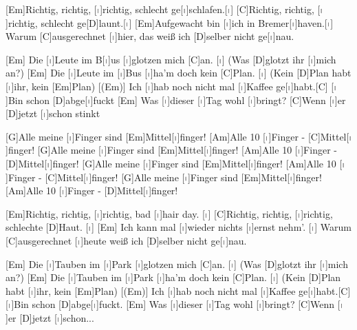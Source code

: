

\begin{guitar}
	[Em]Richtig, richtig, [$\shortmid$]richtig, schlecht ge[$\shortmid$]schlafen.[$\shortmid$]{}
	[C]Richtig, richtig, [$\shortmid$]richtig, schlecht ge[D]launt.[$\shortmid$]{}
	[Em]Aufgewacht bin [$\shortmid$]ich in Bremer[$\shortmid$]haven.[$\shortmid$]{}
	Warum [C]ausgerechnet [$\shortmid$]hier, das weiß ich [D]selber nicht ge[$\shortmid$]nau.
	
	[Em] Die [$\shortmid$]Leute im B[$\shortmid$]us [$\shortmid$]glotzen mich [C]an. [$\shortmid$] (Was [D]glotzt ihr [$\shortmid$]mich an?)
	[Em] Die [$\shortmid$]Leute im [$\shortmid$]Bus [$\shortmid$]ha'm doch kein [C]Plan. [$\shortmid$] (Kein [D]Plan habt [$\shortmid$]ihr, kein [Em]Plan)
	[(Em)] Ich [$\shortmid$]hab noch nicht mal [$\shortmid$]Kaffee ge[$\shortmid$]habt.[C] [$\shortmid$]Bin schon [D]abge[$\shortmid$]fuckt
	[Em] Was [$\shortmid$]dieser [$\shortmid$]Tag wohl [$\shortmid$]bringt? [C]Wenn [$\shortmid$]er [D]jetzt [$\shortmid$]schon stinkt
	
	[G]Alle meine [$\shortmid$]Finger sind [Em]Mittel[$\shortmid$]finger! [Am]Alle 10 [$\shortmid$]Finger - [C]Mittel[$\shortmid$]finger!
	[G]Alle meine [$\shortmid$]Finger sind [Em]Mittel[$\shortmid$]finger! [Am]Alle 10 [$\shortmid$]Finger - [D]Mittel[$\shortmid$]finger!
	[G]Alle meine [$\shortmid$]Finger sind [Em]Mittel[$\shortmid$]finger! [Am]Alle 10 [$\shortmid$]Finger - [C]Mittel[$\shortmid$]finger!
	[G]Alle meine [$\shortmid$]Finger sind [Em]Mittel[$\shortmid$]finger! [Am]Alle 10 [$\shortmid$]Finger - [D]Mittel[$\shortmid$]finger!
	
	[Em]Richtig, richtig, [$\shortmid$]richtig, bad [$\shortmid$]hair day. [$\shortmid$]{}
	[C]Richtig, richtig, [$\shortmid$]richtig, schlechte [D]Haut. [$\shortmid$]{}
	[Em] Ich kann mal [$\shortmid$]wieder nichts [$\shortmid$]ernst nehm'. [$\shortmid$]{}
	Warum [C]ausgerechnet [$\shortmid$]heute weiß ich [D]selber nicht ge[$\shortmid$]nau.
	
	[Em] Die [$\shortmid$]Tauben im [$\shortmid$]Park [$\shortmid$]glotzen mich [C]an. [$\shortmid$] (Was [D]glotzt ihr [$\shortmid$]mich an?)
	[Em] Die [$\shortmid$]Tauben im [$\shortmid$]Park [$\shortmid$]ha'm doch kein [C]Plan. [$\shortmid$] (Kein [D]Plan habt [$\shortmid$]ihr, kein [Em]Plan)
	[(Em)] Ich [$\shortmid$]hab noch nicht mal [$\shortmid$]Kaffee ge[$\shortmid$]habt.[C] [$\shortmid$]Bin schon [D]abge[$\shortmid$]fuckt.
	[Em] Was [$\shortmid$]dieser [$\shortmid$]Tag wohl [$\shortmid$]bringt? [C]Wenn [$\shortmid$]er [D]jetzt [$\shortmid$]schon...
	
	 
\end{guitar}
